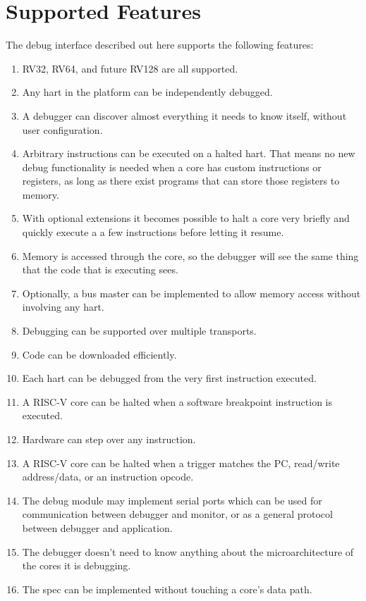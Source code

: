 \documentclass{article}
\begin{document}
\section{Supported Features}
The debug interface described out here supports the following features:
\begin{enumerate}
   \item RV32, RV64, and future RV128 are all supported.
   \item Any hart in the platform can be independently debugged.
   \item A debugger can discover almost everything it needs to know itself,
       without user configuration.
   \item Arbitrary instructions can be executed on a halted hart. That means no
       new debug functionality is needed when a core has custom instructions or
       registers, as long as there exist programs that can store those
       registers to memory.
   \item With optional extensions it becomes possible to halt a core very
       briefly and quickly execute a a few instructions before letting it
       resume.
   \item Memory is accessed through the core, so the debugger will see the same
       thing that the code that is executing sees.
   \item Optionally, a bus master can be implemented to allow memory access
       without involving any hart.
   \item Debugging can be supported over multiple transports.
   \item Code can be downloaded efficiently.
   \item Each hart can be debugged from the very first instruction executed.
   \item A RISC-V core can be halted when a software breakpoint instruction is
       executed.
   \item Hardware can step over any instruction.
   \item A RISC-V core can be halted when a trigger matches the PC, read/write
       address/data, or an instruction opcode.
   \item The debug module may implement serial ports which can be used for
       communication between debugger and monitor, or as a general protocol
       between debugger and application.
   \item The debugger doesn't need to know anything about the microarchitecture
       of the cores it is debugging.
   \item The spec can be implemented without touching a core's data path.
\end{enumerate}
\end{document}
